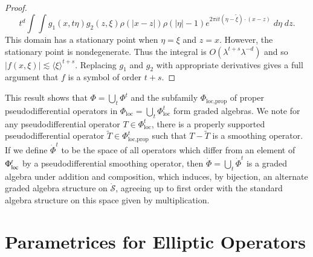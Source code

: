 \begin{proof}
    \[ t^d \int \int g_1(x, t \eta) g_2(z,\xi) \rho(|x - z|) \rho(|\eta| - 1) e^{2 \pi i t (\eta - \tilde{\xi}) \cdot (x - z)}\; d\eta\; dz. \]
    This domain has a stationary point when $\eta = \xi$ and $z = x$. However, the stationary point is nondegenerate. Thus the integral is $O(\lambda^{t + s} \lambda^{-d})$ and so $|f(x,\xi)| \lesssim \langle \xi \rangle^{t + s}$. Replacing $g_1$ and $g_2$ with appropriate derivatives gives a full argument that $f$ is a symbol of order $t + s$.
\end{proof}

\begin{remark}
    This result shows that $\Phi = \bigcup_t \Phi^t$ and the subfamily $\Phi_{\text{loc},\text{prop}}$ of proper pseudodifferential operators in $\Phi_{\text{loc}} = \bigcup_t \Phi^t_{\text{loc}}$ form graded algebras. We note for any pseudodifferential operator $T \in \Phi^t_{\text{loc}}$, there is a properly supported pseudodifferential operator $\tilde{T} \in \Phi_{\text{loc},\text{prop}}^t$ such that $T - \tilde{T}$ is a smoothing operator. If we define $\dot{\Phi}^t$ to be the space of all operators which differ from an element of $\Phi^t_{\text{loc}}$ by a pseudodifferential smoothing operator, then $\dot{\Phi} = \bigcup_t \dot{\Phi}^t$ is a graded algebra under addition and composition, which induces, by bijection, an alternate graded algebra structure on $\dot{\mathcal{S}}$, agreeing up to first order with the standard algebra structure on this space given by multiplication.
\end{remark}

\section{Parametrices for Elliptic Operators}

